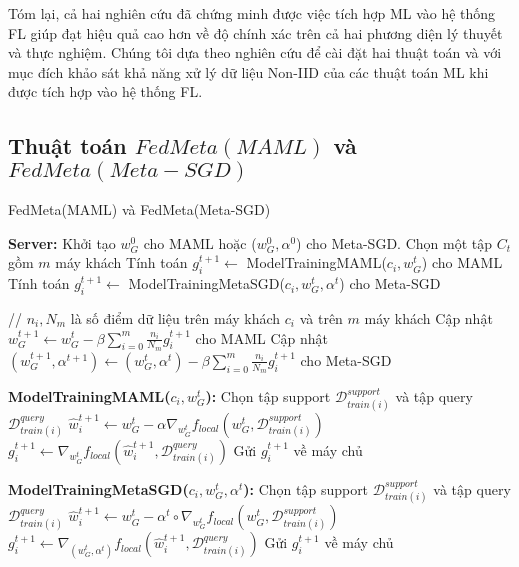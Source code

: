 Tóm lại, cả hai nghiên cứu \parencite{chen2018federated, fallah2020personalized} đã chứng minh được việc tích hợp ML vào hệ thống FL giúp đạt hiệu quả cao hơn  về độ chính xác trên cả hai phương diện lý thuyết và thực nghiệm. Chúng tôi dựa theo nghiên cứu \cite{chen2018federated} để cài đặt hai thuật toán  và  với mục đích khảo sát khả năng xử lý dữ liệu Non-IID của các thuật toán ML khi được tích hợp vào hệ thống FL.

\subsection{Thuật toán $FedMeta(MAML)$ và $FedMeta(Meta-SGD)$}

\begin{algorithm}[H]
    \caption{FedMeta(MAML) và FedMeta(Meta-SGD) \cite{chen2018federated}} \label{alg:fedmeta}
    \begin{algorithmic}[1]
        \State \textbf{Server:}
        \State Khởi tạo $w_G^0$ cho MAML hoặc ($w_G^0, \alpha^0$) cho Meta-SGD.
            \State Chọn một tập $C_t$ gồm $m$ máy khách
                \State Tính toán $g_i^{t+1} \gets$ ModelTrainingMAML($c_i, w_G^t$) cho MAML
                \State Tính toán $g_i^{t+1} \gets$ ModelTrainingMetaSGD($c_i, w_G^t, \alpha^t$) cho Meta-SGD
            \EndFor

            \State
            \State // $n_i, N_m$ là số điểm dữ liệu trên máy khách $c_i$ và trên $m$ máy khách
            \State Cập nhật $w_G^{t+1} \gets w_G^t - \beta \sum_{i=0}^m \frac{n_i}{N_m} g_i^{t+1}$ cho MAML
            \State Cập nhật $(w_G^{t+1}, \alpha^{t+1}) \gets (w_G^t, \alpha^t) - \beta \sum_{i=0}^m \frac{n_i}{N_m} g_i^{t+1}$ cho Meta-SGD
        \EndFor

        \Statex

        \State\textbf{ModelTrainingMAML($c_i, w_G^t$):} 
        \State Chọn tập support $\mathcal{D}_{train(i)}^{support}$ và tập query $\mathcal{D}_{train(i)}^{query}$
        \State $\hat{w}_i^{t+1} \gets w_G^t - \alpha\nabla_{w_G^t} f_{local}(w_G^t, \mathcal{D}_{train(i)}^{support})$
        \State $g_i^{t+1} \gets \nabla_{w_G^t} f_{local}(\hat{w}_i^{t+1}, \mathcal{D}_{train(i)}^{query})$
        \State Gửi $g_i^{t+1}$ về máy chủ

        \Statex

        \State\textbf{ModelTrainingMetaSGD($c_i, w_G^t, \alpha^t$):} 
        \State Chọn tập support $\mathcal{D}_{train(i)}^{support}$ và tập query $\mathcal{D}_{train(i)}^{query}$
        \State $\hat{w}_i^{t+1} \gets w_G^t - \alpha^t \circ \nabla_{w_G^t} f_{local}(w_G^t, \mathcal{D}_{train(i)}^{support})$
        \State $g_i^{t+1} \gets \nabla_{(w_G^t,\alpha^t)} f_{local}(\hat{w}_i^{t+1}, \mathcal{D}_{train(i)}^{query})$
        \State Gửi $g_i^{t+1}$ về máy chủ
    \end{algorithmic}
\end{algorithm}

